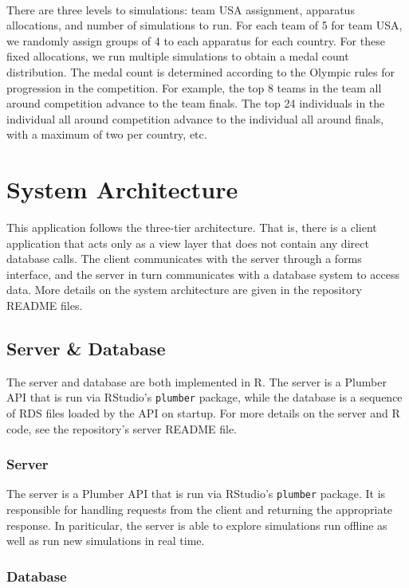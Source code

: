 \documentclass{article}
\begin{document}
\ 

\noindent There are three levels to simulations: team USA assignment, apparatus allocations, and number of simulations to run. 
For each team of 5 for team USA, we randomly assign groups of 4 to each apparatus for each country. For these fixed allocations, 
we run multiple simulations to obtain a medal count distribution. The medal count is determined according to the Olympic rules for progression 
in the competition. For example, the top 8 teams in the team all around competition advance to the team finals. The top 24 
individuals in the individual all around competition advance to the individual all around finals, with a maximum of two per country, etc.

\section{System Architecture}\label{sec:system}
This application follows the three-tier architecture. That is, there is a client
application that acts only as a view layer that does not contain any direct database calls.
The client communicates with the server through a forms interface, and the server
in turn communicates with a database system to access data. More details on 
the system architecture are given in the repository README files.

\subsection{Server \& Database}

The server and database are both implemented in R. The server is a Plumber API that is run via RStudio's \texttt{plumber} package, 
while the database is a sequence of RDS files loaded by the API on startup. For more details on the server and R code,
see the repository's server README file.

\subsubsection{Server}

The server is a Plumber API that is run via RStudio's \texttt{plumber} package. 
It is responsible for handling requests from the client and returning the appropriate 
response. In pariticular, the server is able to explore simulations run offline 
as well as run new simulations in real time.

\subsubsection{Database}
\end{document}
